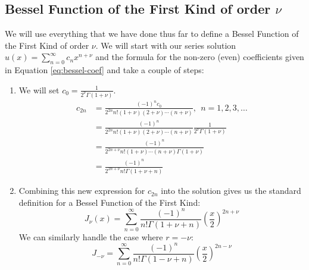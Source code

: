 \subsection{Bessel Function of the First Kind of order $\nu$}
We will use everything that we have done thus far to define a Bessel Function of the First Kind of order $\nu$.  We will start with our series solution $u(x) = \sum_{n=0}^{\infty}c_n{x^{n+\nu}}$ and the formula for the non-zero (even) coefficients given in Equation \ref{eq:bessel-coef} and take a couple of steps:
\begin{enumerate}
\item We will set $c_0 = \frac{1}{2^{\nu}\Gamma(1+\nu)}$.
\begin{align*}
c_{2n} &= \frac{(-1)^n c_0}{2^{2n}n!(1+\nu)(2+\nu)\cdots(n+\nu)}, \ \ n=1,2,3,\dots \\
&= \frac{(-1)^n}{2^{2n}n!(1+\nu)(2+\nu)\cdots(n+\nu)}\frac{1}{2^{\nu}\Gamma(1+\nu)} \\
&= \frac{(-1)^n}{2^{2n+\nu}n!(1+\nu)\cdots(n+\nu)\Gamma(1+\nu)} \\
&= \frac{(-1)^n}{2^{2n+\nu}n!\Gamma(1+\nu+n)}
\end{align*}  
\item Combining this new expression for $c_{2n}$ into the solution gives us the standard definition for a Bessel Function of the First Kind:
\begin{equation}
J_{\nu}(x) = \sum\limits_{n=0}^{\infty}\frac{(-1)^n}{n!\Gamma(1+\nu+n)}\left(\frac{x}{2}\right)^{2n+\nu}
\label{eq:beq-first-kind-order-nu}
\end{equation}
We can similarly handle the case where $r = -\nu$:
\begin{equation*}
J_{-\nu} = \sum\limits_{n=0}^{\infty}\frac{(-1)^n}{n!\Gamma(1-\nu+n)}\left(\frac{x}{2} \right)^{2n-\nu}
\end{equation*}

\end{enumerate}

